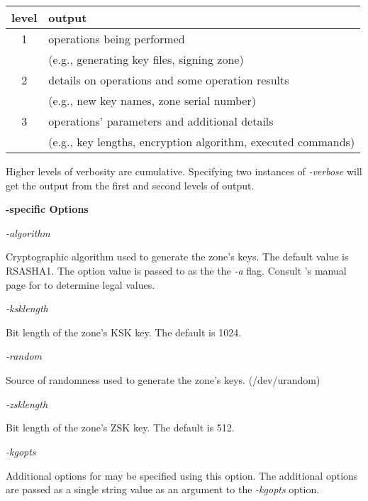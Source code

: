 \begin{description}
\begin{table}[ht]
\begin{center}
\begin{tabular}{c|l}
level  & output							 \\
\hline
1 & operations being performed					 \\
  & (e.g., generating key files, signing zone)			 \\
2 & details on operations and some operation results		 \\
  & (e.g., new key names, zone serial number)			 \\
3 & operations' parameters and additional details		 \\
  & (e.g., key lengths, encryption algorithm, executed commands) \\
\end{tabular} 
\end{center}
\end{table}

Higher levels of verbosity are cumulative.  Specifying two instances of
{\it -verbose} will get the output from the first and second levels of output.

\end{description}

{\bf {}-specific Options}

\begin{description}

\item {\it -algorithm}\verb" "

Cryptographic algorithm used to generate the zone's keys.  The default value
is RSASHA1.  The option value is passed to  as the the {\it
-a} flag.  Consult 's manual page for to determine legal
values.

\item {\it -ksklength}\verb" "

Bit length of the zone's KSK key.
The default is 1024.

\item {\it -random}\verb" "

Source of randomness used to generate the zone's keys.	(/dev/urandom)

\item {\it -zsklength}\verb" "

Bit length of the zone's ZSK key.
The default is 512.

\item {\it -kgopts}\verb" "

Additional options for  may be specified using this option.
The additional options are passed as a single string value as an argument to
the {\it -kgopts} option.

\end{description}

